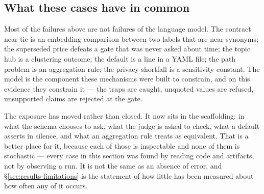 \subsection{What these cases have in common}

Most of the failures above are not failures of the language model. The contract near-tie is an embedding comparison between two labels that are near-synonyms; the superseded price defeats a gate that was never asked about time; the topic hub is a clustering outcome; the default is a line in a YAML file; the path problem is an aggregation rule; the privacy shortfall is a sensitivity constant. The model is the component these mechanisms were built to constrain, and on this evidence they constrain it --- the traps are caught, unquoted values are refused, unsupported claims are rejected at the gate.

The exposure has moved rather than closed. It now sits in the scaffolding: in what the schema chooses to ask, what the judge is asked to check, what a default asserts in silence, and what an aggregation rule treats as equivalent. That is a better place for it, because each of those is inspectable and none of them is stochastic --- every case in this section was found by reading code and artifacts, not by observing a run. It is not the same as an absence of error, and \S\ref{sec:results-limitations} is the statement of how little has been measured about how often any of it occurs.

